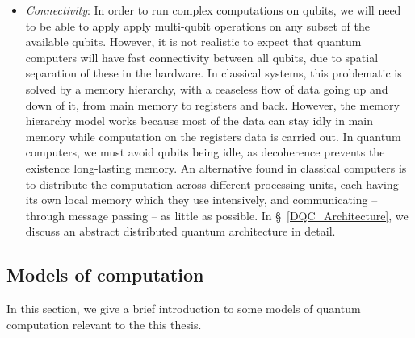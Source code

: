 \begin{itemize}
  \item \textit{Connectivity}: In order to run complex computations on qubits, we will need to be able to apply apply multi-qubit operations on any subset of the available qubits. However, it is not realistic to expect that quantum computers will have fast connectivity between all qubits, due to spatial separation of these in the hardware. In classical systems, this problematic is solved by a memory hierarchy, with a ceaseless flow of data going up and down of it, from main memory to registers and back. However, the memory hierarchy model works because most of the data can stay idly in main memory while computation on the registers data is carried out. In quantum computers, we must avoid qubits being idle, as decoherence prevents the existence long-lasting memory. An alternative found in classical computers is to distribute the computation across different processing units, each having its own local memory which they use intensively, and communicating -- through message passing -- as little as possible. In \S~\ref{DQC_Architecture}, we discuss an abstract distributed quantum architecture in detail.

\end{itemize}


\subsection{Models of computation}

In this section, we give a brief introduction to some models of quantum computation relevant to the this thesis.

